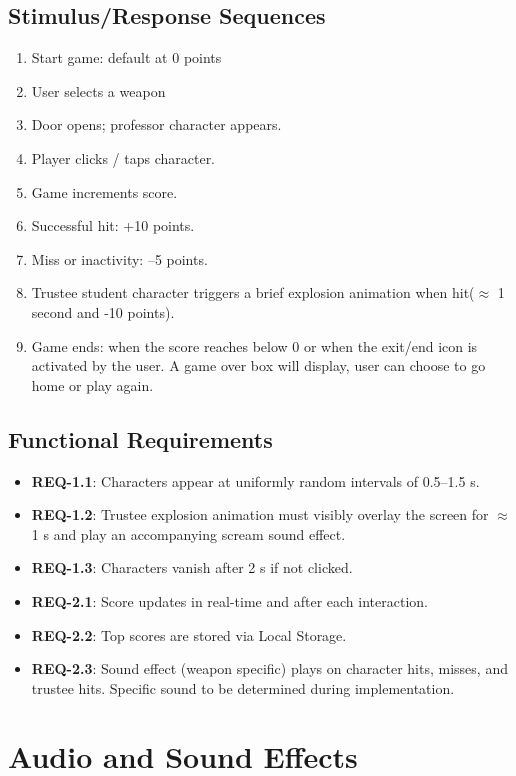 \documentclass[11pt]{scrreprt}
\begin{document}
\subsection{Stimulus/Response Sequences}
\begin{enumerate}
  \item Start game: default at 0 points
  \item User selects a weapon
  \item Door opens; professor character appears.
  \item Player clicks / taps character.
  \item Game increments score.
  \item Successful hit: +10 points.
  \item Miss or inactivity: –5 points.
  \item Trustee student character triggers a brief explosion animation when hit($\approx$ 1 second and -10 points).
  \item Game ends: when the score reaches below 0 or when the exit/end icon is activated by the user. A game over box will display, user can choose to go home or play again.
\end{enumerate}

\subsection{Functional Requirements}
\begin{itemize}
  \item \textbf{REQ-1.1}: Characters appear at uniformly random intervals of 0.5–1.5 s.
  \item \textbf{REQ-1.2}: Trustee explosion animation must visibly overlay the screen for $\approx$ 1 s and play an accompanying scream sound effect.
  \item \textbf{REQ-1.3}: Characters vanish after 2 s if not clicked.
  \item \textbf{REQ-2.1}: Score updates in real-time and after each interaction.
  \item \textbf{REQ-2.2}: Top scores are stored via Local Storage.
  \item \textbf{REQ-2.3}: Sound effect (weapon specific) plays on character hits, misses, and trustee hits. Specific sound to be determined during implementation.
\end{itemize}

\section{Audio and Sound Effects}
\end{document}
